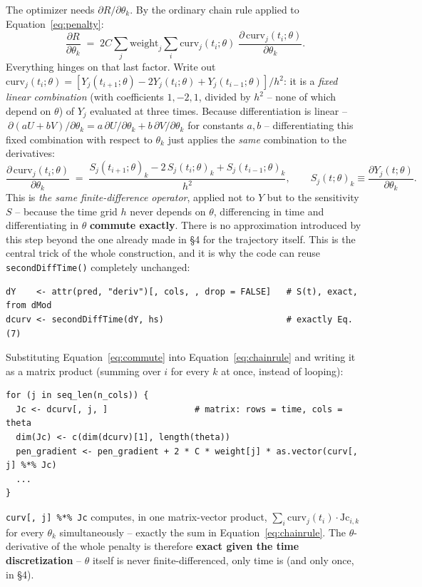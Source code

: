 \documentclass[11pt]{article}
\newcommand{\code}[1]{\texttt{#1}}
\begin{document}
The optimizer needs $\partial R/\partial\theta_k$. By the ordinary chain
rule applied to Equation~\eqref{eq:penalty}:
\begin{equation}
  \frac{\partial R}{\partial\theta_k} \;=\; 2C\sum_j \mathrm{weight}_j \sum_i
  \mathrm{curv}_j(t_i;\theta)\;\frac{\partial\, \mathrm{curv}_j(t_i;\theta)}{\partial\theta_k}.
  \label{eq:chainrule}
\end{equation}
Everything hinges on that last factor. Write out
$\mathrm{curv}_j(t_i;\theta) = [Y_j(t_{i+1};\theta) - 2Y_j(t_i;\theta) +
Y_j(t_{i-1};\theta)]/h^2$: it is a \emph{fixed linear combination} (with
coefficients $1,-2,1$, divided by $h^2$ -- none of which depend on $\theta$)
of $Y_j$ evaluated at three times. Because differentiation is linear
--$\ \partial(aU+bV)/\partial\theta_k = a\,\partial U/\partial\theta_k +
b\,\partial V/\partial\theta_k$ for constants $a,b$ -- differentiating this
fixed combination with respect to $\theta_k$ just applies the \emph{same}
combination to the derivatives:
\begin{equation}
  \frac{\partial\,\mathrm{curv}_j(t_i;\theta)}{\partial\theta_k}
  \;=\; \frac{S_j(t_{i+1};\theta)_k - 2\,S_j(t_i;\theta)_k + S_j(t_{i-1};\theta)_k}{h^2},
  \qquad S_j(t;\theta)_k \equiv \frac{\partial Y_j(t;\theta)}{\partial\theta_k}.
  \label{eq:commute}
\end{equation}
This is \emph{the same finite-difference operator}, applied not to $Y$ but
to the sensitivity $S$ -- because the time grid $h$ never depends on
$\theta$, differencing in time and differentiating in $\theta$
\textbf{commute exactly}. There is no approximation introduced by this
step beyond the one already made in \S4 for the trajectory itself. This is
the central trick of the whole construction, and it is why the code can
reuse \code{secondDiffTime()} completely unchanged:
\begin{lstlisting}
dY    <- attr(pred, "deriv")[, cols, , drop = FALSE]   # S(t), exact, from dMod
dcurv <- secondDiffTime(dY, hs)                        # exactly Eq. (7)
\end{lstlisting}
Substituting Equation~\eqref{eq:commute} into Equation~\eqref{eq:chainrule}
and writing it as a matrix product (summing over $i$ for every $k$ at
once, instead of looping):
\begin{lstlisting}
for (j in seq_len(n_cols)) {
  Jc <- dcurv[, j, ]                 # matrix: rows = time, cols = theta
  dim(Jc) <- c(dim(dcurv)[1], length(theta))
  pen_gradient <- pen_gradient + 2 * C * weight[j] * as.vector(curv[, j] %*% Jc)
  ...
}
\end{lstlisting}
\code{curv[, j] \%*\% Jc} computes, in one matrix-vector product,
$\sum_i \mathrm{curv}_j(t_i)\cdot\mathrm{Jc}_{i,k}$ for every $\theta_k$
simultaneously -- exactly the sum in Equation~\eqref{eq:chainrule}. The
$\theta$-derivative of the whole penalty is therefore \textbf{exact given
the time discretization} -- $\theta$ itself is never finite-differenced,
only time is (and only once, in \S4).
\end{document}
